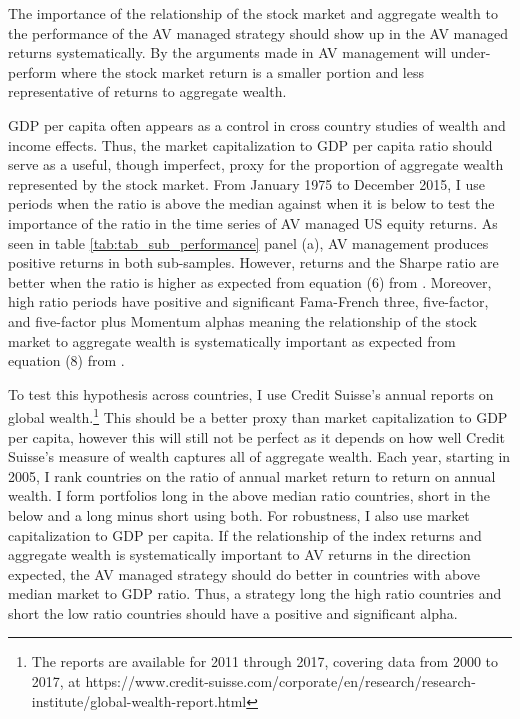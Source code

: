 The importance of the relationship of the stock market and aggregate wealth to the performance of the AV managed strategy should show up in the AV managed returns systematically. By the arguments made in \citet{pollet_average_2010} AV management will under-perform where the stock market return is a smaller portion and less representative of returns to aggregate wealth.

GDP per capita  often appears as a control in cross country studies of wealth and income effects. \citep{barro_cross-country_1989,levine_what_1993,baird_aggregate_2010} Thus, the market capitalization to GDP per capita ratio should serve as a useful, though imperfect, proxy for the proportion of aggregate wealth represented by the stock market. From January 1975 to December 2015, I use periods when the ratio is above the median against when it is below to test the importance of the ratio in the time series of AV managed US equity returns. As seen in table \ref{tab:tab_sub_performance} panel (a), AV management produces positive returns in both sub-samples. However, returns and the Sharpe ratio are better when the ratio is higher as expected from equation (6) from \citet{pollet_average_2010}. Moreover, high ratio periods have positive and significant Fama-French three, five-factor, and five-factor plus Momentum alphas meaning the relationship of the stock market to aggregate wealth is systematically important as expected from equation (8) from \citet{pollet_average_2010}. %

To test this hypothesis across countries, I use Credit Suisse's annual reports on global wealth.\footnote{The reports are available for 2011 through 2017, covering data from 2000 to 2017, at https://www.credit-suisse.com/corporate/en/research/research-institute/global-wealth-report.html} This should be a better proxy than market capitalization to GDP per capita, however this will still not be perfect as it depends on how well Credit Suisse's measure of wealth captures all of aggregate wealth. Each year, starting in 2005, I rank countries on the ratio of annual market return to return on annual wealth. I form portfolios long in the above median ratio countries, short in the below and a long minus short using both. For robustness, I also use market capitalization to GDP per capita. If the relationship of the index returns and aggregate wealth is systematically important to AV returns in the direction expected, the AV managed strategy should do better in countries with above median market to GDP ratio. Thus, a strategy long the high ratio countries and short the low ratio countries should have a positive and significant alpha. 

